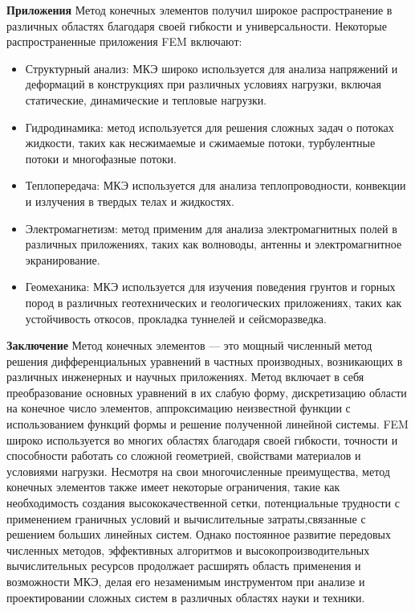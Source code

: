 \textbf{Приложения}
Метод конечных элементов получил широкое распространение в различных
областях благодаря своей гибкости и универсальности.
Некоторые распространенные приложения FEM включают:
\begin{itemize}
\item Структурный анализ: МКЭ широко используется для анализа напряжений
и деформаций в конструкциях при различных условиях нагрузки, включая
статические, динамические и тепловые нагрузки.
\item Гидродинамика: метод используется для решения сложных задач о
потоках жидкости, таких как несжимаемые и сжимаемые потоки, турбулентные
потоки и многофазные потоки.
\item Теплопередача: МКЭ используется для анализа теплопроводности,
конвекции и излучения в твердых телах и жидкостях.
\item Электромагнетизм: метод применим для анализа электромагнитных
полей в различных приложениях, таких как волноводы,
антенны и электромагнитное экранирование.
\item Геомеханика: МКЭ используется для изучения поведения грунтов
и горных пород в различных геотехнических и геологических
приложениях, таких как устойчивость откосов,
прокладка туннелей и сейсморазведка.
\end{itemize}

\textbf{Заключение}
Метод конечных элементов — это мощный численный метод решения
дифференциальных уравнений в частных производных, возникающих
в различных инженерных и научных приложениях.
Метод включает в себя преобразование основных уравнений
в их слабую форму, дискретизацию области на конечное число
элементов, аппроксимацию неизвестной функции с использованием
функций формы и решение полученной линейной системы.
FEM широко используется во многих областях
благодаря своей гибкости, точности и способности
работать со сложной геометрией, свойствами
материалов и условиями нагрузки.
Несмотря на свои многочисленные преимущества, метод конечных
элементов также имеет некоторые ограничения,
такие как необходимость создания высококачественной сетки,
потенциальные трудности с применением граничных условий
и вычислительные затраты,связанные с решением больших линейных систем.
Однако постоянное развитие передовых численных методов,
эффективных алгоритмов и высокопроизводительных вычислительных
ресурсов продолжает расширять область применения
и возможности МКЭ, делая его незаменимым инструментом при
анализе и проектировании сложных систем
в различных областях науки и техники.

